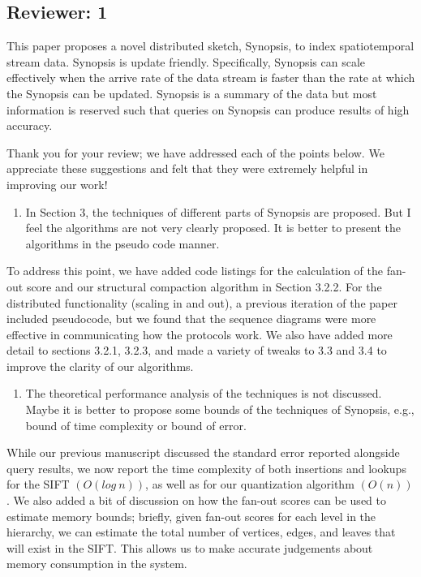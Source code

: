 \documentclass{article}
\begin{document}
\subsection*{Reviewer: 1}\label{reviewer-1}

This paper proposes a novel distributed sketch, Synopsis, to index
spatiotemporal stream data. Synopsis is update friendly. Specifically,
Synopsis can scale effectively when the arrive rate of the data stream
is faster than the rate at which the Synopsis can be updated. Synopsis
is a summary of the data but most information is reserved such that
queries on Synopsis can produce results of high accuracy.

\begin{tcolorbox}
Thank you for your review; we have addressed each of the points below. We appreciate these suggestions and felt that they were extremely helpful in improving our work!
\end{tcolorbox}

\begin{enumerate}
\def\labelenumi{\arabic{enumi})}
\item
  In Section 3, the techniques of different parts of Synopsis are
  proposed. But I feel the algorithms are not very clearly proposed. It
  is better to present the algorithms in the pseudo code manner.
\end{enumerate}

\begin{tcolorbox}
To address this point, we have added code listings for the calculation
of the fan-out score and our structural compaction algorithm in Section
3.2.2. For the distributed functionality (scaling in and out), a
previous iteration of the paper included pseudocode, but we found that
the sequence diagrams were more effective in communicating how the
protocols work. We also have added more detail to sections 3.2.1, 3.2.3,
and made a variety of tweaks to 3.3 and 3.4 to improve the clarity of
our algorithms.
\end{tcolorbox}

\begin{enumerate}
\def\labelenumi{\arabic{enumi})}
\setcounter{enumi}{1}
\item
  The theoretical performance analysis of the techniques is not
  discussed. Maybe it is better to propose some bounds of the techniques
  of Synopsis, e.g., bound of time complexity or bound of error.
\end{enumerate}

\begin{tcolorbox}
While our previous manuscript discussed the standard error reported
alongside query results, we now report the time complexity of both
insertions and lookups for the SIFT $(O(log\ n))$, as well as for our
quantization algorithm $(O(n))$. We also added a bit of discussion on how
the fan-out scores can be used to estimate memory bounds; briefly, given
fan-out scores for each level in the hierarchy, we can estimate the
total number of vertices, edges, and leaves that will exist in the SIFT.
This allows us to make accurate judgements about memory consumption in
the system.
\end{tcolorbox}
\end{document}
